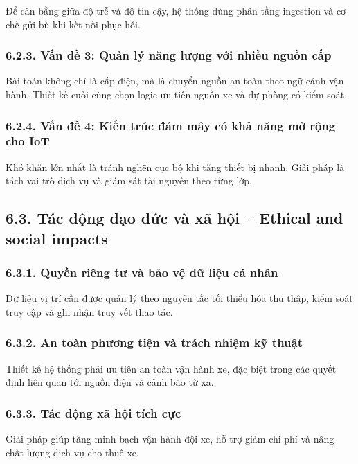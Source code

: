 \documentclass[a4paper]{extarticle}
\begin{document}
Để cân bằng giữa độ trễ và độ tin cậy, hệ thống dùng phân tầng ingestion và cơ chế gửi bù khi kết nối phục hồi.

\subsubsection{6.2.3. Vấn đề 3: Quản lý năng lượng với nhiều nguồn cấp}

Bài toán không chỉ là cấp điện, mà là chuyển nguồn an toàn theo ngữ cảnh vận hành. Thiết kế cuối cùng chọn logic ưu tiên nguồn xe và dự phòng có kiểm soát.

\subsubsection{6.2.4. Vấn đề 4: Kiến trúc đám mây có khả năng mở rộng cho IoT}

Khó khăn lớn nhất là tránh nghẽn cục bộ khi tăng thiết bị nhanh. Giải pháp là tách vai trò dịch vụ và giám sát tài nguyên theo từng lớp.

\subsection{6.3. Tác động đạo đức và xã hội -- Ethical and social impacts}

\subsubsection{6.3.1. Quyền riêng tư và bảo vệ dữ liệu cá nhân}

Dữ liệu vị trí cần được quản lý theo nguyên tắc tối thiểu hóa thu thập, kiểm soát truy cập và ghi nhận truy vết thao tác.

\subsubsection{6.3.2. An toàn phương tiện và trách nhiệm kỹ thuật}

Thiết kế hệ thống phải ưu tiên an toàn vận hành xe, đặc biệt trong các quyết định liên quan tới nguồn điện và cảnh báo từ xa.

\subsubsection{6.3.3. Tác động xã hội tích cực}

Giải pháp giúp tăng minh bạch vận hành đội xe, hỗ trợ giảm chi phí và nâng chất lượng dịch vụ cho thuê xe.
\end{document}
